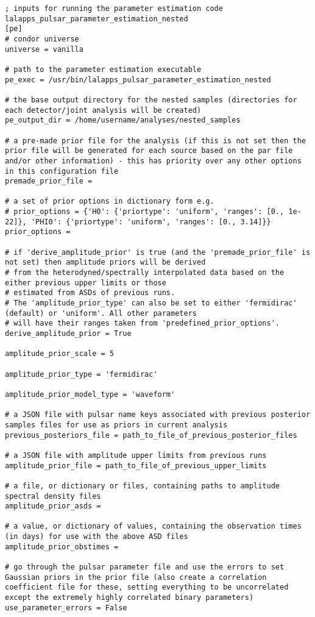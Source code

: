 \begin{lstlisting}[frame=single,basicstyle=\tiny\ttfamily]
; inputs for running the parameter estimation code lalapps_pulsar_parameter_estimation_nested
[pe]
# condor universe
universe = vanilla

# path to the parameter estimation executable
pe_exec = /usr/bin/lalapps_pulsar_parameter_estimation_nested

# the base output directory for the nested samples (directories for each detector/joint analysis will be created)
pe_output_dir = /home/username/analyses/nested_samples

# a pre-made prior file for the analysis (if this is not set then the prior file will be generated for each source based on the par file and/or other information) - this has priority over any other options in this configuration file
premade_prior_file =

# a set of prior options in dictionary form e.g.
# prior_options = {'H0': {'priortype': 'uniform', 'ranges': [0., 1e-22]}, 'PHI0': {'priortype': 'uniform', 'ranges': [0., 3.14]}}
prior_options =

# if 'derive_amplitude_prior' is true (and the 'premade_prior_file' is not set) then amplitude priors will be derived
# from the heterodyned/spectrally interpolated data based on the either previous upper limits or those
# estimated from ASDs of previous runs.
# The 'amplitude_prior_type' can also be set to either 'fermidirac' (default) or 'uniform'. All other parameters
# will have their ranges taken from 'predefined_prior_options'.
derive_amplitude_prior = True

amplitude_prior_scale = 5

amplitude_prior_type = 'fermidirac'

amplitude_prior_model_type = 'waveform'

# a JSON file with pulsar name keys associated with previous posterior samples files for use as priors in current analysis
previous_posteriors_file = path_to_file_of_previous_posterior_files

# a JSON file with amplitude upper limits from previous runs
amplitude_prior_file = path_to_file_of_previous_upper_limits

# a file, or dictionary or files, containing paths to amplitude spectral density files
amplitude_prior_asds =

# a value, or dictionary of values, containing the observation times (in days) for use with the above ASD files
amplitude_prior_obstimes =

# go through the pulsar parameter file and use the errors to set Gaussian priors in the prior file (also create a correlation coefficient file for these, setting everything to be uncorrelated except the extremely highly correlated binary parameters)
use_parameter_errors = False


\end{lstlisting}
